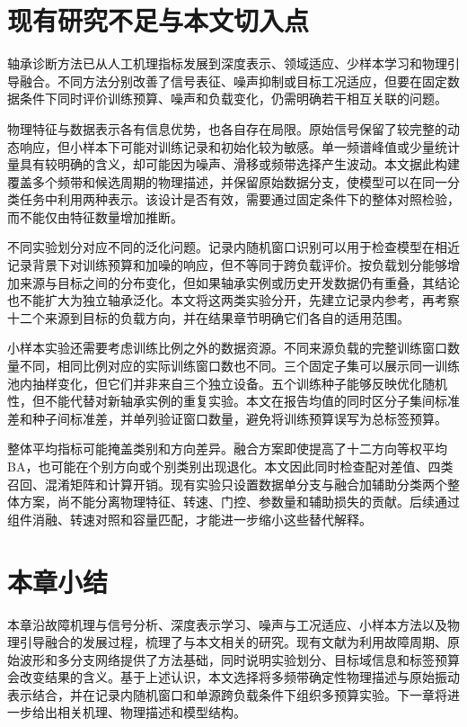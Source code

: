 \documentclass[UTF8,12pt,openany,twoside]{ctexbook}
\numberwithin{equation}{chapter}
\begin{document}
\section{现有研究不足与本文切入点}\label{ux73b0ux6709ux7814ux7a76ux4e0dux8db3ux4e0eux672cux6587ux5207ux5165ux70b9}

轴承诊断方法已从人工机理指标发展到深度表示、领域适应、少样本学习和物理引导融合。不同方法分别改善了信号表征、噪声抑制或目标工况适应，但要在固定数据条件下同时评价训练预算、噪声和负载变化，仍需明确若干相互关联的问题。

物理特征与数据表示各有信息优势，也各自存在局限。原始信号保留了较完整的动态响应，但小样本下可能对训练记录和初始化较为敏感。单一频谱峰值或少量统计量具有较明确的含义，却可能因为噪声、滑移或频带选择产生波动。本文据此构建覆盖多个频带和候选周期的物理描述，并保留原始数据分支，使模型可以在同一分类任务中利用两种表示。该设计是否有效，需要通过固定条件下的整体对照检验，而不能仅由特征数量增加推断。

不同实验划分对应不同的泛化问题。记录内随机窗口识别可以用于检查模型在相近记录背景下对训练预算和加噪的响应，但不等同于跨负载评价。按负载划分能够增加来源与目标之间的分布变化，但如果轴承实例或历史开发数据仍有重叠，其结论也不能扩大为独立轴承泛化。本文将这两类实验分开，先建立记录内参考，再考察十二个来源到目标的负载方向，并在结果章节明确它们各自的适用范围。

小样本实验还需要考虑训练比例之外的数据资源。不同来源负载的完整训练窗口数量不同，相同比例对应的实际训练窗口数也不同。三个固定子集可以展示同一训练池内抽样变化，但它们并非来自三个独立设备。五个训练种子能够反映优化随机性，但不能代替对新轴承实例的重复实验。本文在报告均值的同时区分子集间标准差和种子间标准差，并单列验证窗口数量，避免将训练预算误写为总标签预算。

整体平均指标可能掩盖类别和方向差异。融合方案即使提高了十二方向等权平均BA，也可能在个别方向或个别类别出现退化。本文因此同时检查配对差值、四类召回、混淆矩阵和计算开销。现有实验只设置数据单分支与融合加辅助分类两个整体方案，尚不能分离物理特征、转速、门控、参数量和辅助损失的贡献。后续通过组件消融、转速对照和容量匹配，才能进一步缩小这些替代解释。

\section{本章小结}\label{ux672cux7ae0ux5c0fux7ed3}

本章沿故障机理与信号分析、深度表示学习、噪声与工况适应、小样本方法以及物理引导融合的发展过程，梳理了与本文相关的研究。现有文献为利用故障周期、原始波形和多分支网络提供了方法基础，同时说明实验划分、目标域信息和标签预算会改变结果的含义。基于上述认识，本文选择将多频带确定性物理描述与原始振动表示结合，并在记录内随机窗口和单源跨负载条件下组织多预算实验。下一章将进一步给出相关机理、物理描述和模型结构。
\end{document}
